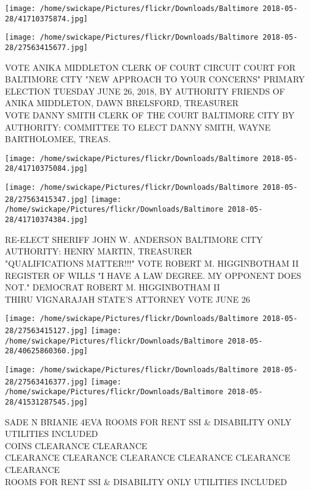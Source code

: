 \documentclass[10pt,letterpaper]{article}
\begin{document}
\texttt{[image: /home/swickape/Pictures/flickr/Downloads/Baltimore 2018-05-28/41710375874.jpg]}

\vspace{0.25in}
\texttt{[image: /home/swickape/Pictures/flickr/Downloads/Baltimore 2018-05-28/27563415677.jpg]}

VOTE ANIKA MIDDLETON CLERK OF COURT CIRCUIT COURT FOR BALTIMORE CITY "NEW APPROACH TO YOUR CONCERNS" PRIMARY ELECTION TUESDAY JUNE 26, 2018, BY AUTHORITY FRIENDS OF ANIKA MIDDLETON, DAWN BRELSFORD, TREASURER\\
VOTE DANNY SMITH CLERK OF THE COURT BALTIMORE CITY BY AUTHORITY: COMMITTEE TO ELECT DANNY SMITH, WAYNE BARTHOLOMEE, TREAS.
\pagebreak

\texttt{[image: /home/swickape/Pictures/flickr/Downloads/Baltimore 2018-05-28/41710375084.jpg]}

\vspace{0.25in}
\texttt{[image: /home/swickape/Pictures/flickr/Downloads/Baltimore 2018-05-28/27563415347.jpg]}
\texttt{[image: /home/swickape/Pictures/flickr/Downloads/Baltimore 2018-05-28/41710374384.jpg]}

RE{-}ELECT SHERIFF JOHN W. ANDERSON BALTIMORE CITY AUTHORITY: HENRY MARTIN, TREASURER\\
"QUALIFICATIONS MATTER!!!" VOTE ROBERT M. HIGGINBOTHAM II REGISTER OF WILLS "I HAVE A LAW DEGREE.  MY OPPONENT DOES NOT."  DEMOCRAT ROBERT M. HIGGINBOTHAM II\\
THIRU VIGNARAJAH STATE'S ATTORNEY VOTE JUNE 26
\pagebreak

\texttt{[image: /home/swickape/Pictures/flickr/Downloads/Baltimore 2018-05-28/27563415127.jpg]}
\texttt{[image: /home/swickape/Pictures/flickr/Downloads/Baltimore 2018-05-28/40625860360.jpg]}

\texttt{[image: /home/swickape/Pictures/flickr/Downloads/Baltimore 2018-05-28/27563416377.jpg]}
\texttt{[image: /home/swickape/Pictures/flickr/Downloads/Baltimore 2018-05-28/41531287545.jpg]}

SADE N BRIANIE 4EVA ROOMS FOR RENT SSI \& DISABILITY ONLY UTILITIES INCLUDED\\
COINS CLEARANCE CLEARANCE\\
CLEARANCE CLEARANCE CLEARANCE CLEARANCE CLEARANCE CLEARANCE\\
ROOMS FOR RENT SSI \& DISABILITY ONLY UTILITIES INCLUDED
\pagebreak
\end{document}
